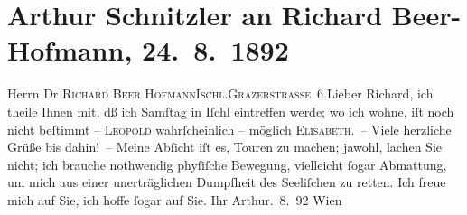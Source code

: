 

         
         \renewcommand{\erwaehntePersonen}{Personen: Richard Beer-Hofmann}
         \renewcommand{\erwaehnteOrte}{Orte: Bad Ischl, Grazer Straße, Hotel Kaiserin Elisabeth, Hotel und Pension Rudolfshöhe (Leopold Petter), Wien}
         \renewcommand{\erwaehnteWerke}{}
               \section[Arthur Schnitzler an Richard Beer-Hofmann, 24. 8. 1892]{ Arthur Schnitzler an Richard Beer-Hofmann, 24. 8. 1892}\nopagebreak{}\rehead{ }\begin{ledgroupsized}[t]{13cm}\normalsize\beginnumbering \toendnotes[C]{\smallbreak\pagebreak[2]} 
\pstart{}{\pb}Herrn Dr \textsc{Richard Beer
                     Hofmann}\pend{}\pstart{}\textsc{Ischl.}\pend{}\pstart{}\textsc{Grazerstraße 6}.\pend{}{\bigskip}\pstart{}{\pb}Lieber Richard,\pend\pstart
           ich theile Ihnen mit, dß ich Samſtag in Iſchl eintreffen werde; wo ich wohne, iſt noch nicht beſtimmt – \textsc{Leopold} wahrſcheinlich – möglich \textsc{Elisabeth}. –\pend
           \pstart
           {\pb}Viele herzliche Grüße bis dahin! – \pend
           \pstart
           Meine Abſicht iſt es, Touren zu machen; jawohl, lachen Sie nicht; ich brauche
               nothwendig phyſiſche Bewegung, vielleicht ſogar Abmattung, um mich aus einer {\pb}unerträglichen Dumpfheit des Seeliſchen zu retten.\pend
           \pstart
           Ich freue mich auf Sie, ich hoffe ſogar auf Sie.\pend
           \pstart Ihr \spacefill\mbox{Arthur}\pend{}. 8. 92{ }Wien\pend
           
         
         \endnumbering{}\end{ledgroupsized}  \newcommand{\dateiname}{L00118}\newcommand{\titel}{Arthur Schnitzler an Richard Beer-Hofmann, 24. 8. 1892}\newcommand{\editorInnen}{Martin Anton Müller und Gerd-Hermann Susen}
      